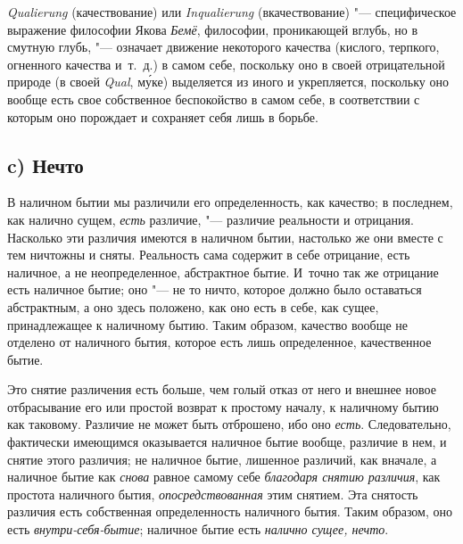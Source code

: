 {\em Qualierung} (качествование) или
{\em Inqualierung} (вкачествование) "--- специфическое
выражение философии Якова {\em Бемё}, философии,
проникающей вглубь, но в смутную глубь, "--- означает движение некоторого
качества (кислого, терпкого, огненного качества и~т.~д.) в самом себе,
поскольку оно в своей отрицательной природе (в своей
{\em Qual},
м\'{у}ке) выделяется из иного и укрепляется, поскольку оно
вообще есть свое собственное беспокойство в самом себе, в соответствии с
которым оно порождает и сохраняет себя лишь в борьбе.

\subsection[c) Нечто]{c) Нечто}
В наличном бытии мы различили его определенность, как качество; в последнем,
как налично сущем, {\em есть} различие, "--- различие
реальности и отрицания. Насколько эти различия имеются в наличном бытии,
настолько же они вместе с тем ничтожны и сняты. Реальность сама содержит в
себе отрицание, есть наличное, а не неопределенное, абстрактное бытие.
И~точно так же отрицание есть наличное бытие; оно "--- не то ничто, которое
должно было оставаться абстрактным, а оно здесь положено, как оно есть в
себе, как сущее, принадлежащее к наличному бытию. Таким образом, качество
вообще не отделено от наличного бытия, которое есть лишь определенное,
качественное бытие.

Это снятие различения есть больше, чем голый отказ от него и внешнее новое
отбрасывание его или простой возврат к простому началу, к наличному бытию
как таковому. Различие не может быть отброшено, ибо оно
{\em есть}. Следовательно, фактически имеющимся
оказывается наличное бытие вообще, различие в нем, и снятие этого различия;
не наличное бытие, лишенное различий, как вначале, а наличное бытие как
{\em снова} равное самому себе
{\em благодаря снятию различия}, как простота наличного
бытия, {\em опосредствованная} этим снятием. Эта
снятость различия есть собственная определенность наличного бытия. Таким
образом, оно есть {\em внутри-себя-бытие}; наличное
бытие есть {\em налично сущее, нечто}.

